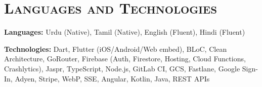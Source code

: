 \documentclass[10.5pt]{article}
\begin{document}
\section*{\scshape Languages and Technologies}

\textbf{Languages:} Urdu (Native), Tamil (Native), English (Fluent), Hindi (Fluent)

\textbf{Technologies:} Dart, Flutter (iOS/Android/Web embed), BLoC, Clean Architecture, GoRouter, Firebase (Auth, Firestore, Hosting, Cloud Functions, Crashlytics), Jaspr, TypeScript, Node.js, GitLab CI, GCS, Fastlane, Google Sign-In, Adyen, Stripe, WebP, SSE, Angular, Kotlin, Java, REST APIs
\end{document}
